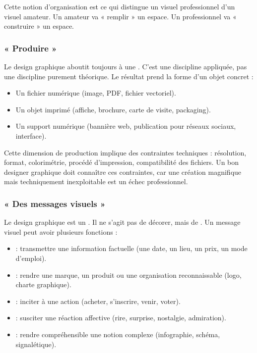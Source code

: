 Cette notion d'organisation est ce qui distingue un visuel professionnel d'un visuel amateur. Un amateur va « remplir » un espace. Un professionnel va « construire » un espace.

\subsubsection{« Produire »}

Le design graphique aboutit toujours à une . C'est une discipline appliquée, pas une discipline purement théorique. Le résultat prend la forme d'un objet concret :

\begin{itemize}
    \item Un fichier numérique (image, PDF, fichier vectoriel).
    \item Un objet imprimé (affiche, brochure, carte de visite, packaging).
    \item Un support numérique (bannière web, publication pour réseaux sociaux, interface).
\end{itemize}

Cette dimension de production implique des contraintes techniques : résolution, format, colorimétrie, procédé d'impression, compatibilité des fichiers. Un bon designer graphique doit connaître ces contraintes, car une création magnifique mais techniquement inexploitable est un échec professionnel.

\subsubsection{« Des messages visuels »}

Le design graphique est un . Il ne s'agit pas de décorer, mais de . Un message visuel peut avoir plusieurs fonctions :

\begin{itemize}
    \item {} : transmettre une information factuelle (une date, un lieu, un prix, un mode d'emploi).
    \item {} : rendre une marque, un produit ou une organisation reconnaissable (logo, charte graphique).
    \item {} : inciter à une action (acheter, s'inscrire, venir, voter).
    \item {} : susciter une réaction affective (rire, surprise, nostalgie, admiration).
    \item {} : rendre compréhensible une notion complexe (infographie, schéma, signalétique).
\end{itemize}

